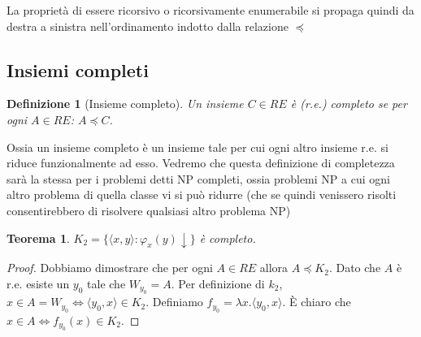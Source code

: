 \documentclass[a4paper,titlepage]{article}
\newtheorem{theorem}{Teorema}[section]
\newtheorem{definition}{Definizione}[section]
\theoremstyle{definition}
\begin{document}
La proprietà di essere ricorsivo o ricorsivamente enumerabile si propaga quindi da destra a sinistra nell'ordinamento indotto dalla relazione $\preceq$

\subsection{Insiemi completi}
\begin{definition}[Insieme completo]
	Un insieme $C\in RE$ è (r.e.) completo se per ogni $ A\in RE$: $A\preceq C$.
\end{definition}

Ossia un insieme completo è un insieme tale per cui ogni altro insieme r.e. si riduce funzionalmente ad esso. Vedremo che questa definizione di completezza sarà la stessa per i problemi detti NP completi, ossia problemi NP a cui ogni altro problema di quella classe vi si può ridurre (che se quindi venissero risolti consentirebbero di risolvere qualsiasi altro problema NP)

\begin{theorem}
	$K_2 =\{\langle x, y \rangle: \varphi_x(y)\downarrow\}$ è completo.
\end{theorem}
\begin{proof}
	Dobbiamo dimostrare che per ogni $A\in RE$ allora $A\preceq K_2$. Dato che $A$ è r.e. esiste un $y_0$ tale che $W_{y_0}=A$. Per definizione di $k_2$, $x\in A = W_{y_0}\iff \langle y_0, x\rangle \in K_2$. Definiamo $f_{y_0}=\lambda x.\langle y_0,x\rangle$. È chiaro che $x\in A\iff f_{y_0}(x)\in K_2$.
\end{proof}
\end{document}
